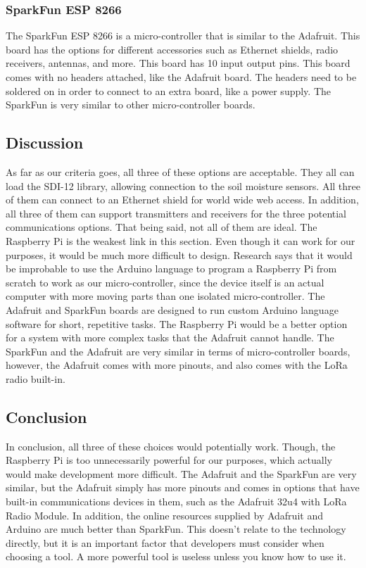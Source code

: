 \documentclass[onecolumn, draftclsnofoot,10pt, compsoc]{IEEEtran}
\begin{document}
    \subsubsection{SparkFun ESP 8266}
    The SparkFun ESP 8266 is a micro-controller that is similar to the Adafruit. 
    This board has the options for different accessories such as Ethernet shields, radio receivers, antennas, and more.
    This board has 10 input output pins.
    This board comes with no headers attached, like the Adafruit board. The headers need to be soldered on in order to connect to an extra board, like a power supply.
    The SparkFun is very similar to other micro-controller boards.
    
    \subsection{Discussion}
    As far as our criteria goes, all three of these options are acceptable.
    They all can load the SDI-12 library, allowing connection to the soil moisture sensors.
    All three of them can connect to an Ethernet shield for world wide web access.
    In addition, all three of them can support transmitters and receivers for the three potential communications options. 
    That being said, not all of them are ideal. 
    The Raspberry Pi is the weakest link in this section. 
    Even though it can work for our purposes, it would be much more difficult to design.
    Research says that it would be improbable to use the Arduino language to program a Raspberry Pi from scratch to work as our micro-controller, since the device itself is an actual computer with more moving parts than one isolated micro-controller. 
    The Adafruit and SparkFun boards are designed to run custom Arduino language software for short, repetitive tasks. 
    The Raspberry Pi would be a better option for a system with more complex tasks that the Adafruit cannot handle. 
    The SparkFun and the Adafruit are very similar in terms of micro-controller boards, however, the Adafruit comes with more pinouts, and also comes with the LoRa radio built-in. 
    
    \subsection{Conclusion}
	In conclusion, all three of these choices would potentially work.
    Though, the Raspberry Pi is too unnecessarily powerful for our purposes, which actually would make development more difficult. 
    The Adafruit and the SparkFun are very similar, but the Adafruit simply has more pinouts and comes in options that have built-in communications devices in them, such as the Adafruit 32u4 with LoRa Radio Module.
    In addition, the online resources supplied by Adafruit and Arduino are much better than SparkFun. 
    This doesn't relate to the technology directly, but it is an important factor that developers must consider when choosing a tool. 
    A more powerful tool is useless unless you know how to use it. 
	
\end{document}
